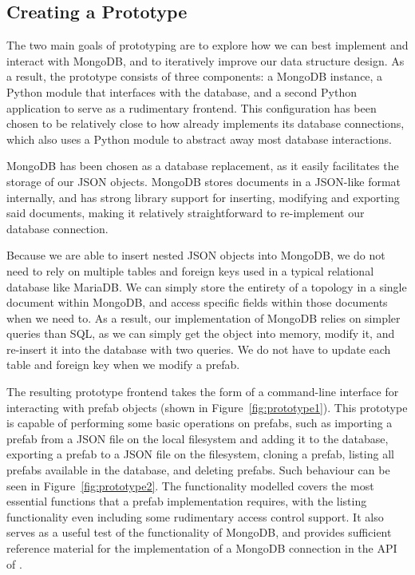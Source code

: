 \documentclass[11pt]{article}
\begin{document}
	
	\subsection{Creating a Prototype}
		The two main goals of prototyping are to explore how we can best implement and interact with MongoDB, and to iteratively improve our data structure design.
		As a result, the prototype consists of three components: a MongoDB instance, a Python module that interfaces with the database, and a second Python application to serve as a rudimentary frontend. 
		This configuration has been chosen to be relatively close to how \opendc{} already implements its database connections, which also uses a Python module to abstract away most database interactions.

		MongoDB has been chosen as a database replacement, as it easily facilitates the storage of our JSON objects.
		MongoDB stores documents in a JSON-like format internally, and has strong library support for inserting, modifying and exporting said documents, making it relatively straightforward to re-implement our database connection.

		Because we are able to insert nested JSON objects into MongoDB, we do not need to rely on multiple tables and foreign keys used in a typical relational database like MariaDB.
		We can simply store the entirety of a topology in a single document within MongoDB, and access specific fields within those documents when we need to.
		As a result, our implementation of MongoDB relies on simpler queries than SQL, as we can simply get the object into memory, modify it, and re-insert it into the database with two queries.
		We do not have to update each table and foreign key when we modify a prefab.

		The resulting prototype frontend takes the form of a command-line interface for interacting with prefab objects (shown in Figure~\ref{fig:prototype1}).
		This prototype is capable of performing some basic operations on prefabs, such as importing a prefab from a JSON file on the local filesystem and adding it to the database, exporting a prefab to a JSON file on the filesystem, cloning a prefab, listing all prefabs available in the database, and deleting prefabs.
		Such behaviour can be seen in Figure~\ref{fig:prototype2}.
		The functionality modelled covers the most essential functions that a prefab implementation requires, with the listing functionality even including some rudimentary access control support.
		It also serves as a useful test of the functionality of MongoDB, and provides sufficient reference material for the implementation of a MongoDB connection in the API of \opendc{}.
\end{document}
